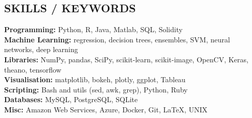 \documentclass[margin,line]{resume}
\begin{document}
\begin{resume}
    \vspace{-1mm}

\sectionline

    \section{\mysidestyle \textbf{\large{S}\small{KILLS} / \large{K}\small{EYWORDS}}}

    \textbf{Programming:} Python, R, Java, Matlab, SQL, Solidity\\
    \textbf{Machine Learning:} regression, decision trees, ensembles, SVM, neural networks, deep learning \\
    \textbf{Libraries:} NumPy, pandas, SciPy, scikit-learn, scikit-image, OpenCV, Keras, theano, tensorflow \\
    \textbf{Visualisation:} matplotlib, bokeh, plotly, ggplot, Tableau \\
    \textbf{Scripting:} Bash and utils (sed, awk, grep), Python, Ruby\\
    \textbf{Databases:} MySQL, PostgreSQL, SQLite\\
    \textbf{Misc:} Amazon Web Services, Azure, Docker, Git, \LaTeX, UNIX

\end{resume}
\end{document}
